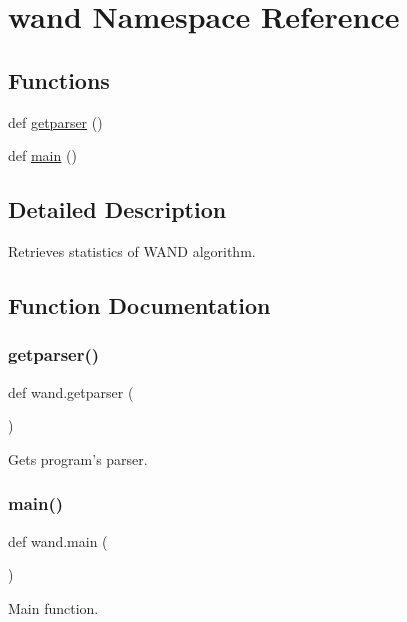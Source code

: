 \hypertarget{namespacewand}{}\section{wand Namespace Reference}
\label{namespacewand}
\subsection*{Functions}
\begin{DoxyCompactItemize}
\item 
def \hyperlink{namespacewand_aedca7390fc72afe15f2d6f7ce499dbbb}{getparser} ()
\item 
def \hyperlink{namespacewand_a60a7a82ab20e25afd016d85f7211c1ea}{main} ()
\end{DoxyCompactItemize}


\subsection{Detailed Description}
\begin{DoxyVerb}Retrieves statistics of WAND algorithm.\end{DoxyVerb}
 

\subsection{Function Documentation}
\mbox{\label{namespacewand_aedca7390fc72afe15f2d6f7ce499dbbb}} 
\subsubsection{\texorpdfstring{getparser()}{getparser()}}
{\footnotesize\ttfamily def wand.\+getparser (\begin{DoxyParamCaption}{ }\end{DoxyParamCaption})}

\begin{DoxyVerb}Gets program's parser.\end{DoxyVerb}
 \mbox{\label{namespacewand_a60a7a82ab20e25afd016d85f7211c1ea}} 
\subsubsection{\texorpdfstring{main()}{main()}}
{\footnotesize\ttfamily def wand.\+main (\begin{DoxyParamCaption}{ }\end{DoxyParamCaption})}

\begin{DoxyVerb}Main function.\end{DoxyVerb}
 